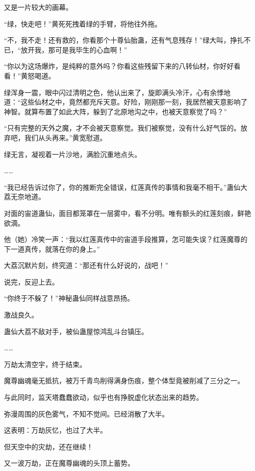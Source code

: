 
\begin{this_body}

又是一片较大的画幕。

“绿，快走吧！”黄死死拽着绿的手臂，将他往外拖。

“不，我不走！还有救的，你看那个十尊仙胎蛊，还有气息残存！”绿大叫，挣扎不已，“放开我，那可是我毕生的心血啊！”

“你以为这场爆炸，是纯粹的意外吗？你看这些残留下来的八转仙材，你好好看看！”黄怒喝道。

绿浑身一震，眼中闪过清明之色，他认出来了，旋即满头冷汗，心有余悸地道：“这些仙材之中，竟然都充斥天意。好险，刚刚那一刻，我居然被天意影响了神智。就算布置了如此大阵，躲到了北原地沟之中，也被天意察觉了吗？”

“只有完整的天外之魔，才不会被天意察觉。我们被察觉，没有什么好气馁的。放弃吧，我们从头再来。”黄宽慰道。

绿无言，凝视着一片沙地，满脸沉重地点头。

……

“我已经告诉过你了，你的推断完全错误，红莲真传的事情和我毫不相干。”蛊仙大荔无奈地道。

对面的宙道蛊仙，面目都笼罩在一层雾中，看不分明。唯有额头的红莲刻痕，鲜艳欲滴。

他（她）冷笑一声：“我以红莲真传中的宙道手段推算，怎可能失误？红莲魔尊的下一道真传，就落在你的身上。”

大荔沉默片刻，终究道：“那还有什么好说的，战吧！”

说完，反迎上去。

“你终于不躲了！”神秘蛊仙同样战意昂扬。

激战良久。

蛊仙大荔不敌对手，被仙蛊屋惊鸿乱斗台镇压。

……

万劫太清空宇，终于结束。

魔尊幽魂毫无抵抗，被万千青鸟削得满身伤痕，整个体型竟被削减了三分之一。

与此同时，监天塔蠢蠢欲动，似乎也有挣脱虚化状态出来的趋势。

弥漫周围的灰色雾气，不知不觉间。已经消散了大半。

这表明：万劫灰忆，也过了大半。

但天空中的灾劫，还在继续！

又一波万劫，正在魔尊幽魂的头顶上蓄势。


\end{this_body}
